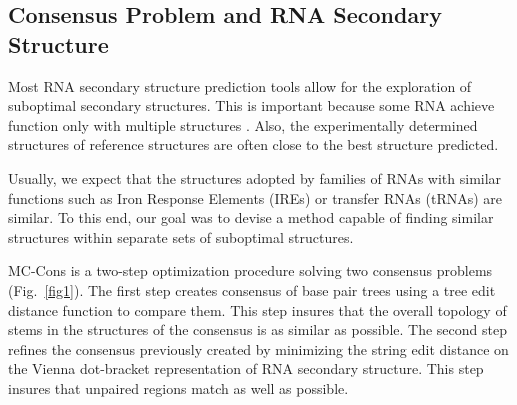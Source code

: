 \documentclass[10pt,letterpaper]{article}
\begin{document}
%
%
%



\subsection*{Consensus Problem and RNA Secondary Structure}

Most RNA secondary structure prediction tools allow for the exploration of suboptimal secondary structures. This is important because some RNA achieve function only with multiple structures \cite{need_subopts}. Also, the experimentally determined structures of reference structures are often close to the best structure predicted.


\noindent Usually, we expect that the structures adopted by families of RNAs with similar functions such as Iron Response Elements (IREs) or transfer RNAs (tRNAs) are similar. To this end, our goal was to devise a method capable of finding similar structures within separate sets of suboptimal structures.

\noindent MC-Cons is a two-step optimization procedure solving two consensus problems (Fig.~\ref{fig1}). The first step creates consensus of base pair trees using a tree edit distance function to compare them. This step insures that the overall topology of stems in the structures of the consensus is as similar as possible. The second step refines the consensus previously created by minimizing the string edit distance on the Vienna dot-bracket representation of RNA secondary structure. This step insures that unpaired regions match as well as possible.
\end{document}

